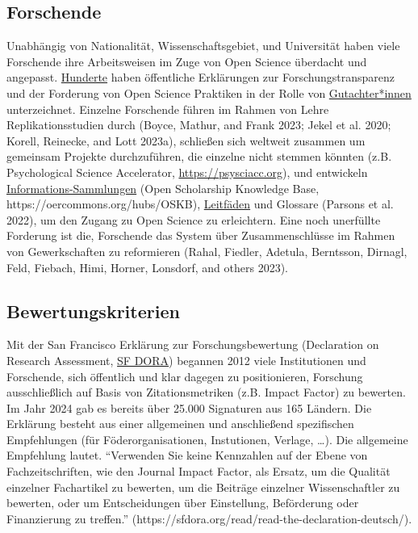 \documentclass[
  letterpaper,
  DIV=11,
  numbers=noendperiod]{scrreprt}
\begin{document}
\subsection{Forschende}\label{forschende}

Unabhängig von Nationalität, Wissenschaftsgebiet, und Universität haben
viele Forschende ihre Arbeitsweisen im Zuge von Open Science überdacht
und angepasst. \href{http://www.researchtransparency.org}{Hunderte}
haben öffentliche Erklärungen zur Forschungstransparenz und der
Forderung von Open Science Praktiken in der Rolle von
\href{https://www.opennessinitiative.org}{Gutachter*innen}
unterzeichnet. Einzelne Forschende führen im Rahmen von Lehre
Replikationsstudien durch (Boyce, Mathur, and Frank 2023; Jekel et al.
2020; Korell, Reinecke, and Lott 2023a), schließen sich weltweit
zusammen um gemeinsam Projekte durchzuführen, die einzelne nicht stemmen
könnten (z.B. Psychological Science Accelerator,
\url{https://psysciacc.org}), und entwickeln
\href{https://docs.google.com/spreadsheets/d/1KUMSeq_Pzp4KveZ7pb5rddcssk1XBTiLHniD0d3nDqo/edit\#gid=0}{Informations-Sammlungen}
(Open Scholarship Knowledge Base, https://oercommons.org/hubs/OSKB),
\href{https://osf.io/jfh3t/}{Leitfäden} und Glossare (Parsons et al.
2022), um den Zugang zu Open Science zu erleichtern. Eine noch
unerfüllte Forderung ist die, Forschende das System über
Zusammenschlüsse im Rahmen von Gewerkschaften zu reformieren (Rahal,
Fiedler, Adetula, Berntsson, Dirnagl, Feld, Fiebach, Himi, Horner,
Lonsdorf, and others 2023).

\subsection{Bewertungskriterien}\label{bewertungskriterien}

Mit der San Francisco Erklärung zur Forschungsbewertung (Declaration on
Research Assessment,
\href{https://sfdora.org/read/read-the-declaration-deutsch/}{SF DORA})
begannen 2012 viele Institutionen und Forschende, sich öffentlich und
klar dagegen zu positionieren, Forschung ausschließlich auf Basis von
Zitationsmetriken (z.B. Impact Factor) zu bewerten. Im Jahr 2024 gab es
bereits über 25.000 Signaturen aus 165 Ländern. Die Erklärung besteht
aus einer allgemeinen und anschließend spezifischen Empfehlungen (für
Föderorganisationen, Instutionen, Verlage, \ldots). Die allgemeine
Empfehlung lautet. ``Verwenden Sie keine Kennzahlen auf der Ebene von
Fachzeitschriften, wie den Journal Impact Factor, als Ersatz, um die
Qualität einzelner Fachartikel zu bewerten, um die Beiträge einzelner
Wissenschaftler zu bewerten, oder um Entscheidungen über Einstellung,
Beförderung oder Finanzierung zu treffen.''
(https://sfdora.org/read/read-the-declaration-deutsch/).
\end{document}
